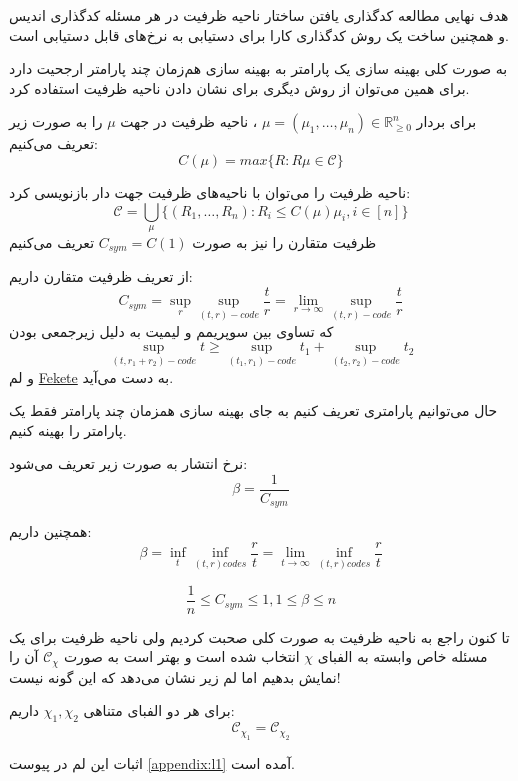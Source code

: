 	هدف نهایی  مطالعه کدگذاری یافتن ساختار ناحیه ظرفیت در هر مسئله کدگذاری اندیس و همچنین ساخت یک روش کدگذاری کارا برای دستیابی به نرخ‌های قابل دستیابی است.
	
	به صورت کلی بهینه سازی یک پارامتر به بهینه سازی هم‌زمان چند پارامتر ارجحیت دارد برای همین می‌توان از روش دیگری برای نشان دادن ناحیه ظرفیت استفاده کرد.
	\begin{definition}
	برای بردار
	$\mu = (\mu_1, \ldots, \mu_n) \in \mathbb{R}_{\geqslant 0}^n $
	، ناحیه ظرفیت در جهت
	$\mu$
	را به صورت زیر تعریف می‌کنیم:
	$$C(\mu) = max \{R: R \mu \in \mathscr{C}\}$$
\end{definition}

\begin{remark}
	ناحیه ظرفیت را می‌توان با ناحیه‌های ظرفیت جهت دار بازنویسی کرد:
	$$\mathscr{C} = \bigcup\limits_{\mu} \{(R_1, \ldots, R_n): R_i \leq C(\mu) \mu_i, i \in [n]\}$$
	ظرفیت متقارن را نیز به صورت
	$C_{sym} = C(1) $
	 تعریف می‌کنیم
\end{remark}

از تعریف ظرفیت متقارن داریم:
$$C_{sym}= \sup\limits_{r} \sup_{(t, r)-code} \dfrac{t}{r} = \lim\limits_{r \rightarrow \infty} \sup_{(t, r)-code} \dfrac{t}{r} $$
که تساوی بین سوپریمم و لیمیت به دلیل زیرجمعی بودن
$$\sup_{(t, r_1 + r_2)-code} t \geqslant \sup_{(t_1, r_1)-code} t_1 + \sup_{(t_2, r_2)-code} t_2$$
و لم
\href{https://en.wikipedia.org/wiki/Subadditivity}{Fekete}
به دست می‌آید.

حال می‌توانیم پارامتری تعریف کنیم به جای بهینه سازی همزمان چند پارامتر فقط یک پارامتر را بهینه کنیم.
\begin{definition}
	نرخ انتشار به صورت زیر تعریف می‌شود:
	$$\beta = \dfrac{1}{C_{sym}}$$
\end{definition}
همچنین داریم:
$$\beta = \inf\limits_{t} \inf\limits_{(t, r) codes} \dfrac{r}{t} = \lim\limits_{t \rightarrow \infty} \inf\limits_{(t, r) codes} \dfrac{r}{t}$$

\begin{remark}
	$$\dfrac{1}{n} \leq C_{sym} \leq 1, 1 \leq \beta \leq n$$
\end{remark}
تا کنون راجع به ناحیه ظرفیت به صورت کلی صحبت کردیم ولی ناحیه ظرفیت برای یک مسئله خاص وابسته به الفبای
$\chi$
انتخاب شده است و بهتر است به صورت
$\mathscr{C}_\chi$
آن را نمایش بدهیم اما لم زیر نشان می‌دهد که این گونه نیست!
\begin{lemma}
	برای هر دو الفبای متناهی
	$\chi_1, \chi_2$
	داریم:
	$$\mathscr{C}_{\chi_1 }= \mathscr{C}_{\chi_2} $$
\end{lemma}
اثبات این لم در پیوست
\autoref{appendix:l1}
 آمده است.

